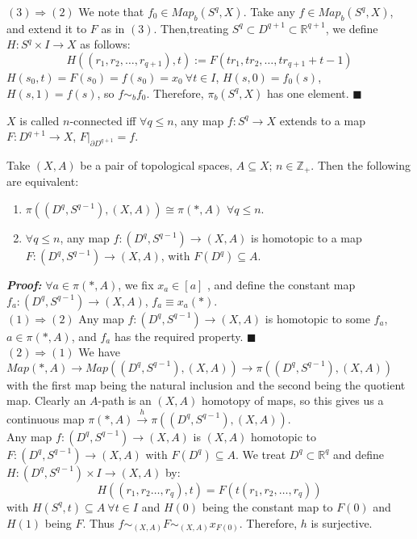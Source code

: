\documentclass[11pt]{article}
\numberwithin{equation}{section}
\begin{document}
$\mathit{(3)\Rightarrow (2)}$ We note that $f_0\in Map_b(S^q,X)$. Take any $f\in Map_b(S^q,X)$, and extend it to $F$ as in $(3)$. Then,treating $S^q\subset D^{q+1}\subset\mathbb{R}^{q+1}$, we define $H:S^q\times I\rightarrow X$ as follows: $$H((r_1,r_2,\dots,r_{q+1}),t):=F(tr_1,tr_2,\dots, tr_{q+1}+t-1)$$ $H(s_0,t)=F(s_0)=f(s_0)=x_0\ \forall t\in I$, $H(s,0)=f_0(s)$, $H(s,1)=f(s)$, so $f\sim_b f_0$. Therefore, $\pi_b(S^q,X)$ has one element. $\blacksquare$
\begin{defn}
     $X$ is called $n$-connected iff $\forall q\leqslant n$, any map $f:S^q\rightarrow X$ extends to a map $F:D^{q+1}\rightarrow X$, $F|_{\partial D^{q+1}}=f$.
\end{defn}
\begin{clm}
     Take $(X,A)$ be a pair of topological spaces, $A\subseteq X$; $n\in \mathbb{Z}_+$. Then the following are equivalent:
     \begin{enumerate}
          \item $\pi((D^q,S^{q-1}),(X,A))\cong\pi(*,A)$  $\forall q\leqslant n$.
          \item $\forall q\leqslant n$, any map $f:(D^q,S^{q-1})\rightarrow (X,A)$ is homotopic to a map $F:(D^q,S^{q-1})\rightarrow (X,A)$, with $F(D^q)\subseteq A$. 
     \end{enumerate}
\end{clm} 
\textbf{\emph{Proof:}} $\forall a\in \pi(*,A)$, we fix $x_a\in [a]$ , and define the constant map $f_a:(D^q,S^{q-1})\rightarrow (X,A)$, $f_a\equiv x_a(*)$. \\[10pt]
$\mathit{(1)\Rightarrow(2)}$ Any map $f:(D^q,S^{q-1})\rightarrow (X,A)$ is homotopic to some $f_a$, $a\in\pi(*,A)$, and $f_a$ has the required property. $\blacksquare$ \\[10pt] 
$\mathit{(2)\Rightarrow(1)}$ We have $Map(*,A)\rightarrow Map((D^q,S^{q-1}),(X,A))\rightarrow\pi((D^q,S^{q-1}),(X,A))$ with the first map being the natural inclusion and the second being the quotient map. Clearly an $A$-path is an $(X,A)$ homotopy of maps, so this gives us a continuous map $\pi(*,A)\xrightarrow{h}\pi((D^q,S^{q-1}),(X,A))$. \\
Any map $f:(D^q,S^{q-1})\rightarrow (X,A)$ is $(X,A)$ homotopic to $F:(D^q,S^{q-1})\rightarrow (X,A)$ with $F(D^q)\subseteq A$. We treat $D^q\subset\mathbb{R}^q$ and define $H:(D^q,S^{q-1})\times I\rightarrow (X,A)$ by: $$H((r_1,r_2\dots,r_q),t)=F(t(r_1,r_2,\dots,r_q))$$ with $H(S^q,t)\subseteq A\ \forall t\in I$ and $H(0)$ being the constant map to $F(0)$ and $H(1)$ being $F$. Thus $f\sim_{(X,A)}F\sim_{(X,A)}x_{F(0)}$. Therefore, $h$ is surjective. \\ 
\end{document}
